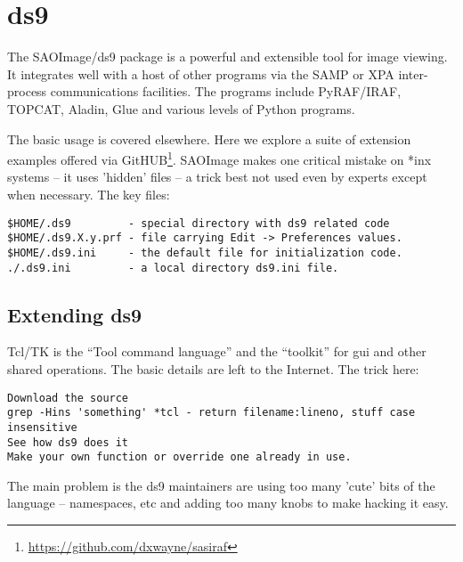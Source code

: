 \section{ds9}

The SAOImage/ds9 package is a powerful and extensible tool for image
viewing.  It integrates well with a host of other programs via the
SAMP or XPA inter-process communications facilities. The programs
include PyRAF/IRAF, TOPCAT, Aladin, Glue and various levels of Python
programs.

The basic usage is covered elsewhere. Here we explore a suite of extension
examples offered via GitHUB\footnote{\url{https://github.com/dxwayne/sasiraf}}.
SAOImage makes one critical mistake on *inx systems -- it uses 'hidden'
files -- a trick best not used even by experts except when necessary.
The key files:

\begingroup \fontsize{10pt}{10pt}
\selectfont
\begin{verbatim} 
$HOME/.ds9         - special directory with ds9 related code
$HOME/.ds9.X.y.prf - file carrying Edit -> Preferences values.
$HOME/.ds9.ini     - the default file for initialization code.
./.ds9.ini         - a local directory ds9.ini file.
\end{verbatim}
\endgroup

\subsection{Extending ds9}

Tcl/TK is the ``Tool command language'' and the ``toolkit'' for gui and
other shared operations. The basic details are left to the Internet.
The trick here:

\begingroup \fontsize{10pt}{10pt}
\selectfont
\begin{verbatim} 
Download the source
grep -Hins 'something' *tcl - return filename:lineno, stuff case insensitive
See how ds9 does it
Make your own function or override one already in use.
\end{verbatim}
\endgroup

The main problem is the ds9 maintainers are using too many 'cute'
bits of the language -- namespaces, etc and adding too many knobs
to make hacking it easy.

